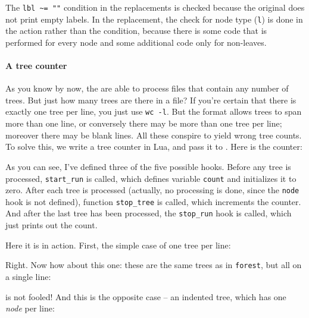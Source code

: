 The {\tt lbl \~{}= ""} condition in the  replacements is checked
because the original  does not print empty labels. In the \topology{}
replacement, the check for node type (\texttt{l}) is done in the action rather
than the condition, because there is some code that is performed for every node
and some additional code only for non-leaves. 
\paragraph{A tree counter}

As you know by now, the \nutils{} are able to process files that contain any
number of trees. But just how many trees are there in a file? If you're certain
that there is exactly one tree per line, you just use \texttt{wc -l}. But the
\nw{} format allows trees to span more than one line, or conversely there may be
more than one tree per line; moreover there may be blank lines. All these
conspire to yield wrong tree counts. To solve this, we write a tree counter in
Lua, and pass it to \luaed. Here is the counter:

\begin{samepage}


\end{samepage}

As you can see, I've defined three of the five possible hooks. Before any tree
is processed, \texttt{start\_run} is called, which defines variable
\texttt{count} and initializes it to zero. After each tree is processed
(actually, no processing is done, since the \texttt{node} hook is not defined),
function \texttt{stop\_tree} is called, which increments the counter. And after
the last tree has been processed, the \texttt{stop\_run} hook is called, which
just prints out the count.

Here it is in action. First, the simple case of one tree per line:







\noindent{}Right. Now how about this one: these are the same trees as in
\texttt{forest}, but all on a single line:







\noindent{}\luaed{} is not fooled! And this is the opposite case -- an indented tree, which has one \emph{node} per line:

